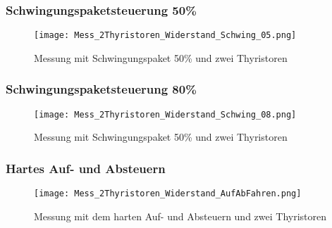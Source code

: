 \begin{appendix}
\newpage
\subsubsection*{Schwingungspaketsteuerung 50\%}

\begin{figure}[ht!]
	\centering
	\texttt{[image: Mess\_2Thyristoren\_Widerstand\_Schwing\_05.png]}	
	\caption{Messung mit Schwingungspaket 50\% und zwei Thyristoren}\label{fig:Mess_2Thyristoren_Schwing_50}
\end{figure}

\newpage
\subsubsection*{Schwingungspaketsteuerung 80\%}

\begin{figure}[ht!]
	\centering
	\texttt{[image: Mess\_2Thyristoren\_Widerstand\_Schwing\_08.png]}	
	\caption{Messung mit Schwingungspaket 50\% und zwei Thyristoren}\label{fig:Mess_2Thyristoren_Schwing_80}	
\end{figure}

\subsubsection*{Hartes Auf- und Absteuern}

\begin{figure}[ht!]
	\centering
	\texttt{[image: Mess\_2Thyristoren\_Widerstand\_AufAbFahren.png]}	
	\caption{Messung mit dem harten Auf- und Absteuern und zwei Thyristoren}\label{Mess_2Thyristoren_Widerstand_AufAbFahren}	
\end{figure}


\end{appendix}
